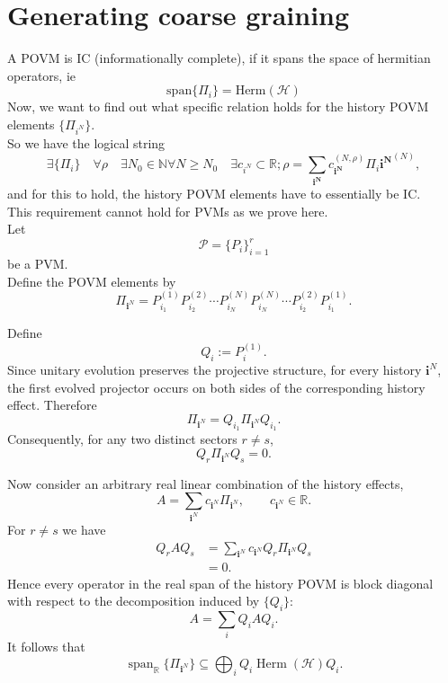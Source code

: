 \documentclass{article}
\begin{document}
\section{Generating coarse graining}
A POVM is IC (informationally complete), if it spans the space of hermitian operators, ie
\begin{equation}
    \text{span}\{\Pi_{i}\} = \text{Herm}(\mathcal{H})
\end{equation}
Now, we want to find out what specific relation holds for the history POVM elements $\{\Pi_{i^N}\}$.\\
So we have the logical string
\begin{equation}
    \exists \{\Pi_{i}\} \quad \forall \rho \quad \exists N_0 \in \mathbb{N} \forall N \geq N_0 \quad \exists c_{i^N} \subset \mathbb{R}; \rho = \sum_{\mathbf{i^N}} c_{\mathbf{i^N}}^{(N,\rho)}\Pi_{i}{\mathbf{i^N}}^{(N)},   
\end{equation}
and for this to hold, the history POVM elements have to essentially be IC.\\
This requirement cannot hold for PVMs as we prove here.\\
Let
\[
\mathcal{P}=\{P_i\}_{i=1}^r
\]
be a PVM.\\
Define the POVM elements by
\[
\Pi_{\mathbf{i}^N}
=
P_{i_1}^{(1)}
P_{i_2}^{(2)}
\cdots
P_{i_N}^{(N)}
P_{i_N}^{(N)}
\cdots
P_{i_2}^{(2)}
P_{i_1}^{(1)}.
\]

Define
\[
Q_i:=P_i^{(1)}.
\]
Since unitary evolution preserves the projective structure,
for every history $\mathbf{i}^N$, the first evolved projector occurs on both
sides of the corresponding history effect. Therefore
\[
\Pi_{\mathbf{i}^N}
=
Q_{i_1}
\Pi_{\mathbf{i}^N}
Q_{i_1}.
\]
Consequently, for any two distinct sectors $r\neq s$,
\[
Q_r\Pi_{\mathbf{i}^N}Q_s=0.
\]

Now consider an arbitrary real linear combination of the history effects,
\[
A=
\sum_{\mathbf{i}^N}
c_{\mathbf{i}^N}\Pi_{\mathbf{i}^N},
\qquad
c_{\mathbf{i}^N}\in\mathbb{R}.
\]
For $r\neq s$ we have
\[
\begin{aligned}
Q_rAQ_s
&=
\sum_{\mathbf{i}^N}
c_{\mathbf{i}^N}
Q_r\Pi_{\mathbf{i}^N}Q_s
\\
&=0.
\end{aligned}
\]
Hence every operator in the real span of the history POVM is block diagonal
with respect to the decomposition induced by $\{Q_i\}$:
\[
A=\sum_iQ_iAQ_i.
\]
It follows that
\[
\operatorname{span}_{\mathbb{R}}
\{\Pi_{\mathbf{i}^N}\}
\subseteq
\bigoplus_i
Q_i\operatorname{Herm}(\mathcal{H})Q_i.
\]
\end{document}
